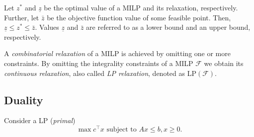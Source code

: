 Let $z^*$ and $\underline{z}$ be the optimal value of a MILP and its relaxation, respectively. 
Further, let $\bar{z}$ be the objective function value of some feasible point.
Then, $\underline{z}\leq z^* \leq \bar{z}$.
Values $\underline{z}$ and $\bar{z}$ are referred to as a lower bound and an upper bound, respectively.

A \emph{combinatorial relaxation} of a MILP is achieved by omitting one or more constraints. 
By omitting the integrality constraints of a MILP $\mathcal{F}$ we obtain its \emph{continuous relaxation}, also called \emph{LP relaxation}, denoted as LP$(\mathcal{F})$.

\subsection{Duality}

Consider a LP (\emph{primal})
\begin{equation}
	\max c^\top x   
	\text{ subject to } 
	  Ax \leq b, 
	  x   \geq 0. 
\label{eq:primal}
\end{equation}


